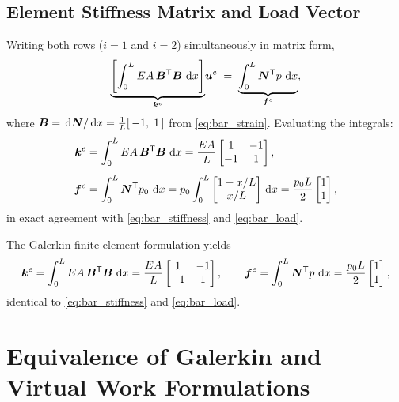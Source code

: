 \subsection{Element Stiffness Matrix and Load Vector}
\label{sec:galerkin_fe_matrices}

Writing both rows ($i = 1$ and $i = 2$) simultaneously in matrix form,
\[
    \underbrace{
    \left[\int_0^L EA\,\bm{B}^{\mathsf{T}}\bm{B}\,\,\mathrm{d} x\right]
    }_{\bm{k}^e}\!\bm{u}^e
    \;=\;
    \underbrace{
    \int_0^L \bm{N}^{\mathsf{T}} p\,\,\mathrm{d} x
    }_{\bm{f}^e} ,
\]
where $\bm{B} = \,\mathrm{d}\bm{N}/\,\mathrm{d} x = \tfrac{1}{L}[\,-1,\;1\,]$ from
\cref{eq:bar_strain}. Evaluating the integrals:
\begin{align}
    \bm{k}^e
    &= \int_0^L EA\,\bm{B}^{\mathsf{T}}\bm{B}\,\,\mathrm{d} x
     = \frac{EA}{L}\begin{bmatrix}1&-1\\-1&1\end{bmatrix} ,
    \label{eq:galerkin_fe_ke_integral} \\[4pt]
    \bm{f}^e
    &= \int_0^L \bm{N}^{\mathsf{T}} p_0\,\,\mathrm{d} x
     = p_0\int_0^L\begin{bmatrix}1-x/L\\x/L\end{bmatrix}\,\mathrm{d} x
     = \frac{p_0 L}{2}\begin{bmatrix}1\\1\end{bmatrix} ,
    \label{eq:galerkin_fe_fe_integral}
\end{align}
in exact agreement with \cref{eq:bar_stiffness} and \cref{eq:bar_load}.

\begin{importantbox}
The Galerkin finite element formulation yields
\[
    \bm{k}^e = \int_0^L EA\,\bm{B}^{\mathsf{T}}\bm{B}\,\,\mathrm{d} x
              = \frac{EA}{L}\begin{bmatrix}1&-1\\-1&1\end{bmatrix},
    \qquad
    \bm{f}^e = \int_0^L \bm{N}^{\mathsf{T}} p\,\,\mathrm{d} x
              = \frac{p_0 L}{2}\begin{bmatrix}1\\1\end{bmatrix},
\]
identical to \cref{eq:bar_stiffness} and \cref{eq:bar_load}.
\end{importantbox}

\section{Equivalence of Galerkin and Virtual Work Formulations}
\label{sec:galerkin_pvw_equivalence}

